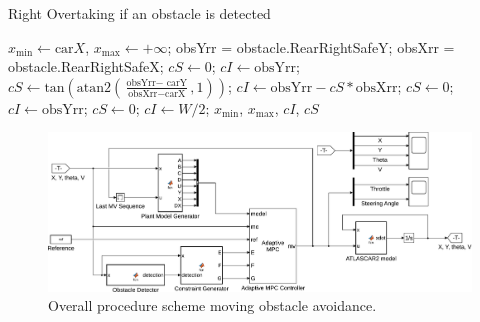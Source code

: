 \begin{algorithm}%
	\caption{Right Overtaking if an obstacle is detected}
	\small
	\begin{algorithmic}[1]
		\State $x_\text{min} \gets \text{car}X $,  $x_\text{max} \gets +\infty$;
		\State obsYrr = obstacle.RearRightSafeY;
		\State obsXrr = obstacle.RearRightSafeX;
		\State $cS \gets 0$; $cI \gets \text{obsYrr}$;
		\Else
		\State $cS \gets \text{tan}(\text{atan2}(\frac{\text{obsYrr}-\text{ carY}}{\text{obsXrr}-\text{carX}},1))$;
		\State $cI \gets \text{obsYrr}-cS*\text{obsXrr}$;
		\EndIf
		\Else
		\State $cS \gets 0$; $cI \gets \text{obsYrr}$;
		\Else
		\State $cS \gets 0$; $cI \gets W/2$;
		\EndIf
		\EndIf
		\State \Return $x_\text{min}$, $x_\text{max}$, $cI$, $cS$
		\EndFunction
	\end{algorithmic}
	\label{alg:rightOvertaking}
\end{algorithm}

\begin{figure}[!h]
	\centering
	\includegraphics[width=\textwidth]{../figure/MovingObstacleAvoidance.pdf}
	\caption{Overall procedure scheme moving obstacle avoidance.}
	\label{fig:MovingObstacleAvoidance}
\end{figure}
%
